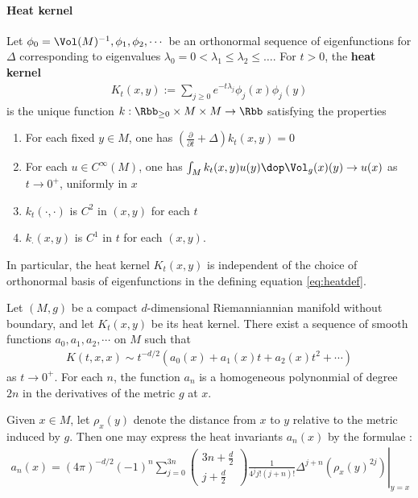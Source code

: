 \paragraph{Heat kernel}
Let $\phi_0=\Vol(M)^{-1},\phi_1,\phi_2,\cdots$ be an orthonormal sequence of eigenfunctions for $\Delta$ corresponding to eigenvalues $\lambda_0=0 <\lambda_1 \leq \lambda_2 \leq \dots$. For $t >0$, the \textbf{heat kernel}
\begin{align}\label{eq:heatdef}
    K_t(x,y):= \sum_{j\geq 0} e^{-t\lambda_j} \phi_j(x)\phi_j(y)
\end{align}
is the unique function $k:\Rbb_{\geq 0} \times M \times M \to \Rbb$ satisfying the properties
\begin{enumerate}
    \item For each fixed $y\in M$, one has $\left(\frac{\partial}{\partial t} + \Delta \right)k_t(x,y) = 0$
    \item For each $u\in C^\infty(M)$, one has $ \int_M k_t(x,y) u(y)  \dop \Vol_g (x)(y) \to u(x)$  as $t \to 0^+$, uniformly in $x$
    \item $k_t(\cdot,\cdot)$ is $C^2$ in $(x,y)$ for each $t$
    \item $k_\cdot( x,y)$ is $C^1$  in $t$ for each $(x,y)$.
\end{enumerate}
In particular, the heat kernel $K_t(x,y)$ is independent of the choice of orthonormal basis of eigenfunctions in the defining equation \ref{eq:heatdef}.

\begin{proposition}\label{prop:asymptoticExpansion}
    Let $(M,g)$ be a compact $d$-dimensional Riemanniannian manifold without boundary, and let $K_t(x,y)$ be its heat kernel.  There exist a sequence of smooth functions $a_0,a_1, a_2,\cdots$ on $M$ such that
    \begin{align}\label{eq:asymptoticExpansion}
        K(t,x,x) \sim t^{-d/2}\left(a_0(x)+ a_1(x) t + a_2(x) t^2 +\cdots  \right)
    \end{align}
    as $t \to 0^+$.  For each $n$, the function $a_n$ is a homogeneous polynonmial of degree $2n$ in the derivatives of the metric $g$ at $x$.

\end{proposition}
Given $x\in M$, let $\rho_x(y)$ denote the distance from $x$ to $y$ relative to the metric induced by $g$.  Then one may express the heat invariants $a_n(x)$ by the formulae \cite[Theorem 1.2.1]{polterovichHeatInvariantsRiemannian2000}:
\begin{align}
    a_n(x) = \left.(4 \pi)^{-d / 2}(-1)^n \sum_{j=0}^{3 n}\left(\begin{array}{c}
                                                                        3 n+\frac{d}{2} \\
                                                                        j+\frac{d}{2}
                                                                    \end{array}\right) \frac{1}{4^j j !(j+n) !} \Delta^{j+n}\left(\rho_x(y)^{2 j}\right)\right|_{y=x}
\end{align}


